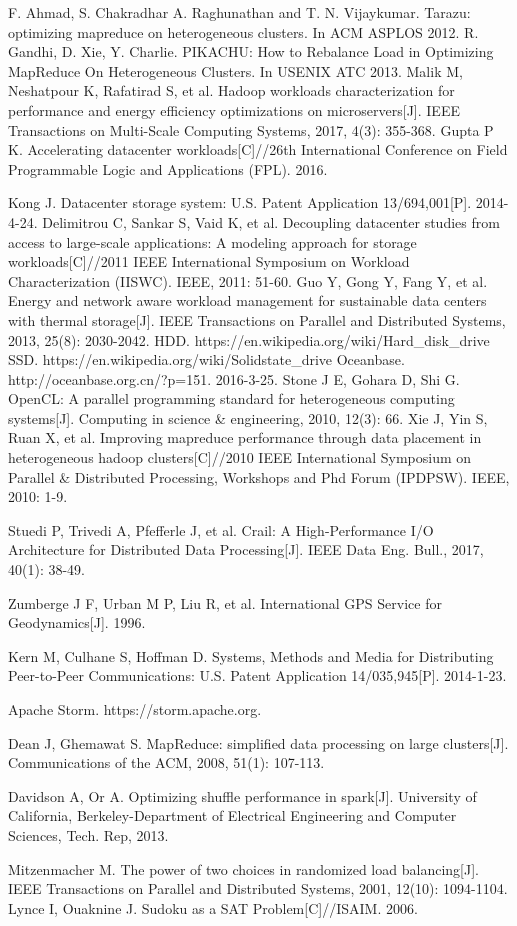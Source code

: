 \documentclass[conference]{IEEEtran}
\begin{document}
\begin{thebibliography}{00}
 F. Ahmad, S. Chakradhar A. Raghunathan and T. N. Vijaykumar. Tarazu: optimizing mapreduce on heterogeneous clusters. In ACM ASPLOS 2012.
 R. Gandhi, D. Xie, Y. Charlie. PIKACHU: How to Rebalance Load in Optimizing MapReduce On Heterogeneous Clusters. In USENIX ATC 2013.
Malik M, Neshatpour K, Rafatirad S, et al. Hadoop workloads characterization for performance and energy efficiency optimizations on microservers[J]. IEEE Transactions on Multi-Scale Computing Systems, 2017, 4(3): 355-368.
Gupta P K. Accelerating datacenter workloads[C]//26th International Conference on Field Programmable Logic and Applications (FPL). 2016.

Kong J. Datacenter storage system: U.S. Patent Application 13/694,001[P]. 2014-4-24.
Delimitrou C, Sankar S, Vaid K, et al. Decoupling datacenter studies from access to large-scale applications: A modeling approach for storage workloads[C]//2011 IEEE International Symposium on Workload Characterization (IISWC). IEEE, 2011: 51-60.
Guo Y, Gong Y, Fang Y, et al. Energy and network aware workload management for sustainable data centers with thermal storage[J]. IEEE Transactions on Parallel and Distributed Systems, 2013, 25(8): 2030-2042.
 HDD. https://en.wikipedia.org/wiki/Hard\_disk\_drive
 SSD. https://en.wikipedia.org/wiki/Solid\-state\_drive
 Oceanbase. http://oceanbase.org.cn/?p=151. 2016-3-25.
Stone J E, Gohara D, Shi G. OpenCL: A parallel programming standard for heterogeneous computing systems[J]. Computing in science \& engineering, 2010, 12(3): 66.
Xie J, Yin S, Ruan X, et al. Improving mapreduce performance through data placement in heterogeneous hadoop clusters[C]//2010 IEEE International Symposium on Parallel \& Distributed Processing, Workshops and Phd Forum (IPDPSW). IEEE, 2010: 1-9.

Stuedi P, Trivedi A, Pfefferle J, et al. Crail: A High-Performance I/O Architecture for Distributed Data Processing[J]. IEEE Data Eng. Bull., 2017, 40(1): 38-49.

Zumberge J F, Urban M P, Liu R, et al. International GPS Service for Geodynamics[J]. 1996.

Kern M, Culhane S, Hoffman D. Systems, Methods and Media for Distributing Peer-to-Peer Communications: U.S. Patent Application 14/035,945[P]. 2014-1-23.


Apache Storm. https://storm.apache.org.

Dean J, Ghemawat S. MapReduce: simplified data processing on large clusters[J]. Communications of the ACM, 2008, 51(1): 107-113.

Davidson A, Or A. Optimizing shuffle performance in spark[J]. University of California, Berkeley-Department of Electrical Engineering and Computer Sciences, Tech. Rep, 2013.

Mitzenmacher M. The power of two choices in randomized load balancing[J]. IEEE Transactions on Parallel and Distributed Systems, 2001, 12(10): 1094-1104.
Lynce I, Ouaknine J. Sudoku as a SAT Problem[C]//ISAIM. 2006.
\end{thebibliography}
\end{document}
